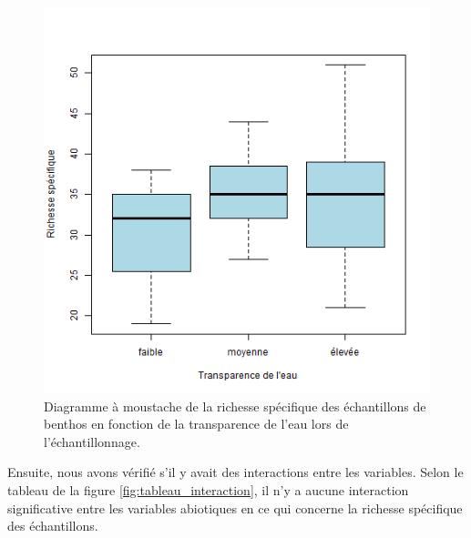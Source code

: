 \documentclass[9pt,twocolumn,twoside,]{pnas-new}
\begin{document}
\begin{figure}
\centering
\includegraphics{boxplot_richesse.png}
\caption{Diagramme à moustache de la richesse spécifique des
échantillons de benthos en fonction de la transparence de l'eau lors de
l'échantillonnage. \label{fig:boxplot_richesse}}
\end{figure}

Ensuite, nous avons vérifié s'il y avait des interactions entre les
variables. Selon le tableau de la figure \ref{fig:tableau_interaction},
il n'y a aucune interaction significative entre les variables abiotiques
en ce qui concerne la richesse spécifique des échantillons.
\end{document}
